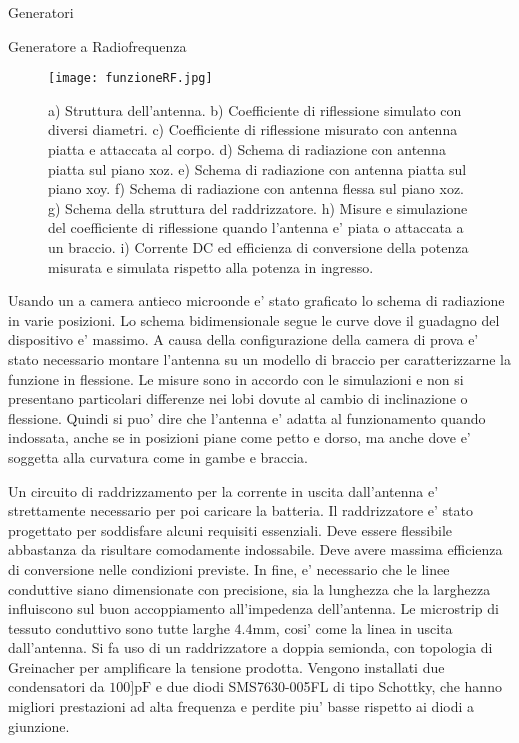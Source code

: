 \begin{section}{Generatori}
\begin{subsection}{Generatore a Radiofrequenza}
        \begin{figure}[hbt!]
            \texttt{[image: funzioneRF.jpg]}
            \centering
            \caption{a) Struttura dell'antenna. b) Coefficiente di riflessione simulato con diversi diametri. c) Coefficiente di riflessione misurato con antenna piatta e attaccata al corpo. d) Schema di radiazione con antenna piatta sul piano xoz. e) Schema di radiazione con antenna piatta sul piano xoy. f) Schema di radiazione con antenna flessa sul piano xoz. g) Schema della struttura del raddrizzatore. h) Misure e simulazione del coefficiente di riflessione quando l'antenna e' piata o attaccata a un braccio. i) Corrente DC ed efficienza di conversione della potenza misurata e simulata rispetto alla potenza in ingresso.\cite{kouWearableAllFabricHybrid2024}}
            \label{fig:funzioneRF}
        \end{figure}
        
        Usando un a camera antieco microonde e' stato graficato lo schema di radiazione in varie posizioni. Lo schema bidimensionale segue le curve dove il guadagno del dispositivo e' massimo. A causa della configurazione della camera di prova e' stato necessario montare l'antenna su un modello di braccio per caratterizzarne la funzione in flessione. Le misure sono in accordo con le simulazioni e non si presentano particolari differenze nei lobi dovute al cambio di inclinazione o flessione. Quindi si puo' dire che l'antenna e' adatta al funzionamento quando indossata, anche se in posizioni piane come petto e dorso, ma anche dove e' soggetta alla curvatura come in gambe e braccia.

        Un circuito di raddrizzamento per la corrente in uscita dall'antenna e' strettamente necessario per poi caricare la batteria. Il raddrizzatore e' stato progettato per soddisfare alcuni requisiti essenziali. Deve essere flessibile abbastanza da risultare comodamente indossabile. Deve avere massima efficienza di conversione nelle condizioni previste. In fine, e' necessario che le linee conduttive siano dimensionate con precisione, sia la lunghezza che la larghezza influiscono sul buon accoppiamento all'impedenza dell'antenna. Le microstrip di tessuto conduttivo sono tutte larghe \(4.4\mathrm{mm}\), cosi' come la linea in uscita dall'antenna. Si fa uso di un raddrizzatore a doppia semionda, con topologia di Greinacher per amplificare la tensione prodotta. Vengono installati due condensatori da \(100]\mathrm{pF}\) e due diodi SMS7630-005FL di tipo Schottky, che hanno migliori prestazioni ad alta frequenza e perdite piu' basse rispetto ai diodi a giunzione. 


\end{subsection}
\end{section}
